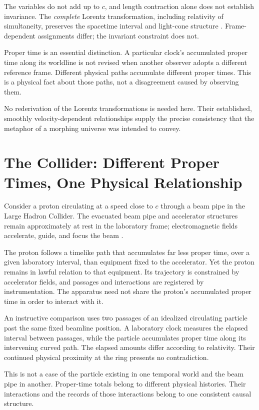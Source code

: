 \documentclass[11pt]{article}
\begin{document}
The variables do not add up to $c$, and length contraction alone does not establish invariance. The \emph{complete} Lorentz transformation, including relativity of simultaneity, preserves the spacetime interval and light-cone structure \cite{minkowski1909,taylorwheeler1992}. Frame-dependent assignments differ; the invariant constraint does not.

Proper time is an essential distinction. A particular clock's accumulated proper time along its worldline is not revised when another observer adopts a different reference frame. Different physical paths accumulate different proper times. This is a physical fact about those paths, not a disagreement caused by observing them.

No rederivation of the Lorentz transformations is needed here. Their established, smoothly velocity-dependent relationships supply the precise consistency that the metaphor of a morphing universe was intended to convey.

\section{The Collider: Different Proper Times, One Physical Relationship}

Consider a proton circulating at a speed close to $c$ through a beam pipe in the Large Hadron Collider. The evacuated beam pipe and accelerator structures remain approximately at rest in the laboratory frame; electromagnetic fields accelerate, guide, and focus the beam \cite{cernlhc,cernaccelerator}.

The proton follows a timelike path that accumulates far less proper time, over a given laboratory interval, than equipment fixed to the accelerator. Yet the proton remains in lawful relation to that equipment. Its trajectory is constrained by accelerator fields, and passages and interactions are registered by instrumentation. The apparatus need not share the proton's accumulated proper time in order to interact with it.

An instructive comparison uses two passages of an idealized circulating particle past the same fixed beamline position. A laboratory clock measures the elapsed interval between passages, while the particle accumulates proper time along its intervening curved path. The elapsed amounts differ according to relativity. Their continued physical proximity at the ring presents no contradiction.

This is not a case of the particle existing in one temporal world and the beam pipe in another. Proper-time totals belong to different physical histories. Their interactions and the records of those interactions belong to one consistent causal structure.
\end{document}
